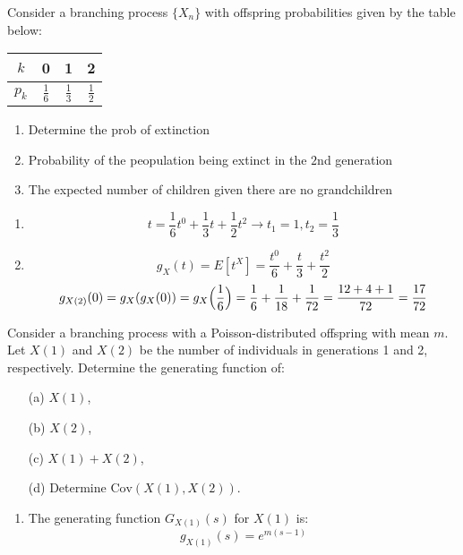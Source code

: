 \begin{enumerate}[label=(\alph*)]
\problem
Consider a branching process $\{X_n\}$ with offspring probabilities given by the table below:
\begin{center}
\begin{tabular}{c|c|c|c}
    $k$ & 0 & 1 & 2 \\ 
\hline
$p_k$ & $\frac{1}{6} $&$ \frac{1}{3}$ & $\frac{1}{2}$ \\ 
    
\end{tabular}
\end{center}
\begin{enumerate}
\item Determine the prob of extinction
\item Probability of the peopulation being extinct in the $2$nd generation
\item The expected number of children given there are no grandchildren

\end{enumerate}


\solution
\begin{enumerate}
    \item \[
    t = \frac{1}{6}t^0 + \frac{1}{3}t + \frac{1}{2}t^2 \rightarrow t_1=1, t_2=\frac{1}{3}
    \]    
    \item \[
    g_X(t) = E[t^X] = \frac{t^0}{6} + \frac{t}{3} + \frac{t^2}{2} 
    \]
    \[
        g_{X(2)}(0) = g_X(g_X(0)) = g_X\Bigl(\frac{1}{6}\Bigr) = \frac{1}{6} + \frac{1}{18} + \frac{1}{72} = \frac{12+4+1}{72} = \frac{17}{72}     
    \]
\end{enumerate}





\setcounter{problem}{42}

\problem Consider a branching process with a Poisson-distributed offspring with mean \( m \). Let \( X(1) \) and \( X(2) \) be the number of individuals in generations 1 and 2, respectively. Determine the generating function of:
\begin{itemize}
    \item[(a)] \( X(1) \),
    \item[(b)] \( X(2) \),
    \item[(c)] \( X(1) + X(2) \),
    \item[(d)] Determine \( \text{Cov}(X(1), X(2)) \).
\end{itemize}

\solution
\begin{enumerate}
    \item The generating function \( G_{X(1)}(s) \) for \( X(1) \) is:
    \[ g_{X(1)}(s) = e^{m(s-1)} \]


\end{enumerate}
\end{enumerate}

